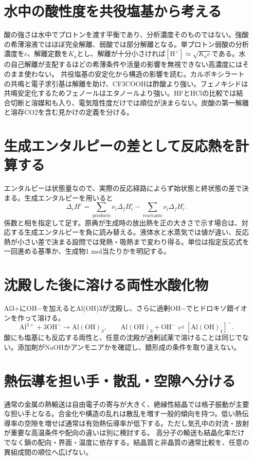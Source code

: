 \section{水中の酸性度を共役塩基から考える}
\label{theory:basicchem:acid}
酸の強さは水中でプロトンを渡す平衡であり、分析濃度そのものではない。強酸の希薄溶液ではほぼ完全解離、弱酸では部分解離となる。単プロトン弱酸の分析濃度を\(c\)、解離定数を\(K_a\)とし、解離が十分小さければ\([\mathrm H^+]\simeq\sqrt{K_ac}\)である。水の自己解離が支配するほどの希薄条件や活量の影響を無視できない高濃度にはそのまま使わない。
共役塩基の安定化から構造の影響を読む。カルボキシラートの共鳴と電子求引基は解離を助け、CF3COOHは酢酸より強い。フェノキシドは共鳴安定化するためフェノールはエタノールより強い。HFとHClの比較では結合切断と溶媒和も入り、電気陰性度だけでは順位が決まらない\autocite{purdue_acid_strength,yale_hydrohalic}。炭酸の第一解離と溶存CO2を含む見かけの定義を分ける。

\section{生成エンタルピーの差として反応熱を計算する}
\label{theory:basicchem:hess}
エンタルピーは状態量なので、実際の反応経路によらず始状態と終状態の差で決まる。生成エンタルピーを用いると
\begin{equation}\Delta_r H^\circ=\sum_{\mathrm{products}}\nu_i\Delta_fH_i^\circ-\sum_{\mathrm{reactants}}\nu_i\Delta_fH_i^\circ.\end{equation}
係数と相を指定して足す。原典が生成時の放出熱を正の大きさで示す場合は、対応する生成エンタルピーを負に読み替える。液体水と水蒸気では値が違い、反応熱が小さい差で決まる設問では発熱・吸熱まで変わり得る\autocite{openstax_hess}。単位は指定反応式を一回進める基準か、生成物1 mol当たりかを明記する。

\section{沈殿した後に溶ける両性水酸化物}
\label{theory:basicchem:amphoteric}
Al3+にOH−を加えるとAl(OH)3が沈殿し、さらに過剰OH−でヒドロキソ錯イオンを作って溶ける。
\begin{equation}\mathrm{Al^{3+}+3OH^-\to Al(OH)_3},\qquad
\mathrm{Al(OH)_3+OH^-\rightleftharpoons[Al(OH)_4]^-}.\end{equation}
酸にも塩基にも反応する両性と、任意の沈殿が過剰試薬で溶けることは同じでない。添加剤がNaOHかアンモニアかを確認し、錯形成の条件を取り違えない\autocite{chem55_ampho}。

\section{熱伝導を担い手・散乱・空隙へ分ける}
\label{theory:basicchem:thermal}
通常の金属の熱輸送は自由電子の寄与が大きく、絶縁性結晶では格子振動が主要な担い手となる。合金化や構造の乱れは散乱を増す一般的傾向を持つ。低い熱伝導率の空隙を増せば通常は有効熱伝導率が低下する。ただし気孔中の対流・放射が重要な高温条件や配向の違いは別に検討する。
高分子の輸送も結晶化率だけでなく鎖の配向・界面・温度に依存する。結晶質と非晶質の通常比較を、任意の異組成間の順位へ広げない\autocite{aist_metal_thermal,openstax_thermal_conduction,chem55_polymer}。

